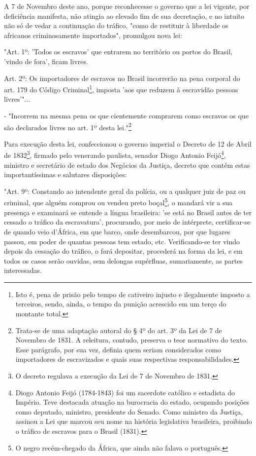 A 7 de Novembro deste ano, porque reconhecesse o governo que a lei
vigente, por deficiência manifesta, não atingia ao elevado fim de sua
decretação, e no intuito não só de vedar a continuação do tráfico, "como
de restituir à liberdade os africanos criminosamente importados",
promulgou nova lei:

"Art. 1º: 'Todos os escravos' que entrarem no território ou portos do
Brasil, 'vindo de fora', ficam livres.

Art. 2º: Os importadores de escravos no Brasil incorrerão na pena
corporal do art. 179 do Código Criminal\footnote{Isto é, pena de
  prisão pelo tempo de cativeiro injusto e ilegalmente imposto a
  terceiros, sendo, ainda, o tempo da punição acrescido em um terço do
  montante total.}, imposta 'aos que reduzem à escravidão pessoas
livres'"...

- "Incorrem na mesma pena os que cientemente comprarem como escravos os
que são declarados livres no art. 1º desta lei."\footnote{Trata-se de
  uma adaptação autoral do § 4º do art. 3º da Lei de 7 de Novembro de
  1831. A releitura, contudo, preserva o teor normativo do texto. Esse
  parágrafo, por sua vez, definia quem seriam considerados como
  importadores de escravizados e quais suas respectivas
  responsabilidades.}

Para execução desta lei, confeccionou o governo imperial o Decreto de 12
de Abril de 1832\footnote{O decreto regulava a execução da Lei de 7 de
  Novembro de 1831.}, firmado pelo venerando paulista, senador Diogo
Antonio Feijó\footnote{Diogo Antonio Feijó (1784-1843) foi um
  sacerdote católico e estadista do Império. Teve destacada atuação na
  burocracia do estado, ocupando posições como deputado, ministro,
  presidente do Senado. Como ministro da Justiça, assinou a Lei que
  marcou seu nome na história legislativa brasileira, proibindo o
  tráfico de escravos para o Brasil (1831).}, ministro e secretário de
estado dos Negócios da Justiça, decreto que contém estas
importantíssimas e salutares disposições:

"Art. 9º: Constando ao intendente geral da polícia, ou a qualquer juiz
de paz ou criminal, que alguém comprou ou vendeu preto boçal\footnote{
  O negro recém-chegado da África, que ainda não falava o português.}, o
mandará vir a sua presença e examinará se entende a língua brasileira:
'se está no Brasil antes de ter cessado o tráfico da escravatura',
procurando, por meio de intérprete, certificar-se de quando veio
d'África, em que barco, onde desembarcou, por que lugares passou, em
poder de quantas pessoas tem estado, etc. Verificando-se ter vindo
depois da cessação do tráfico, o fará depositar, procederá na forma da
lei, e em todos os casos serão ouvidas, sem delongas supérfluas,
sumariamente, as partes interessadas.

